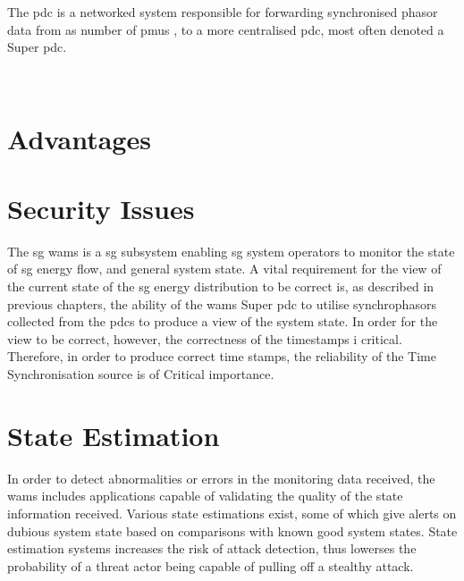 The \acrfull{pdc} is a networked system responsible for forwarding synchronised phasor data from as number of \acrshort{pmu}s 
, to a more centralised \acrshort{pdc}, most often denoted a Super \acrshort{pdc}.



\
 






\section{Advantages}
\section{Security Issues}

The \acrfull{sg} \acrfull{wams} is a \acrshort{sg} subsystem enabling \acrshort{sg} system operators to monitor the state of \acrshort{sg} energy flow, and general system state. 
A vital requirement for the view of the current state of the \acrshort{sg} energy distribution to be correct is, as described in previous chapters, the ability of the \acrshort{wams} Super \acrshort{pdc}  to utilise synchrophasors collected from the \acrshort{pdc}s to produce a view of the system state. In order for the view to be correct, however, the correctness of the timestamps i critical.  Therefore, in order to produce correct time stamps, the reliability of the Time Synchronisation source is of Critical importance.


\section{State Estimation}


In order to detect abnormalities or errors in the monitoring data received, the \acrshort{wams} includes applications capable of validating the quality of the state information received. Various state estimations exist, some of which give alerts on dubious system state based on comparisons with known good system states. State estimation systems increases the risk of attack detection, thus lowerses the probability of a threat actor being capable of pulling off a stealthy attack.   


